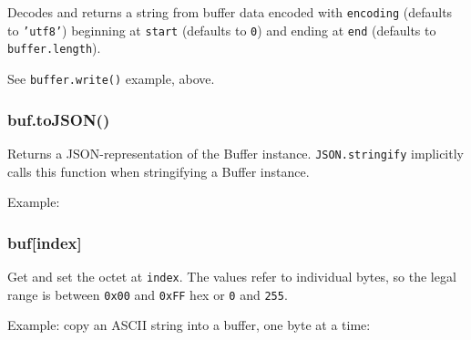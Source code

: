 Decodes and returns a string from buffer data encoded with
\texttt{encoding} (defaults to \texttt{'utf8'}) beginning at
\texttt{start} (defaults to \texttt{0}) and ending at \texttt{end}
(defaults to \texttt{buffer.length}).

See \texttt{buffer.write()} example, above.

\subsubsection{buf.toJSON()}

Returns a JSON-representation of the Buffer instance.
\texttt{JSON.stringify} implicitly calls this function when stringifying
a Buffer instance.

Example:

\begin{Shaded}
\begin{Highlighting}[]
  \NormalTok{);}
 


 
      \NormalTok{=== }
       \NormalTok{)}
  \NormalTok{\});}

\end{Highlighting}
\end{Shaded}

\subsubsection{buf{[}index{]}}

Get and set the octet at \texttt{index}. The values refer to individual
bytes, so the legal range is between \texttt{0x00} and \texttt{0xFF} hex
or \texttt{0} and \texttt{255}.

Example: copy an ASCII string into a buffer, one byte at a time:

